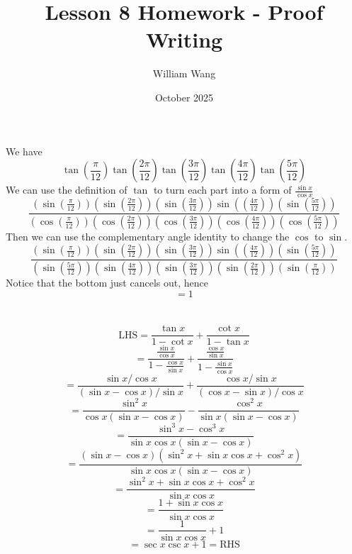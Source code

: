 \documentclass{article}
\title{Lesson 8 Homework - Proof Writing}
\author{William Wang}
\date{October 2025}
\begin{document}
\maketitle

\section{}
We have 
\[\tan(\frac{\pi}{12})\tan(\frac{2\pi}{12})\tan(\frac{3\pi}{12})\tan(\frac{4\pi}{12})\tan(\frac{5\pi}{12})\]
We can use the definition of $\tan$ to turn each part into a form of $\frac{\sin x}{\cos x}$
\[\frac{(\sin(\frac{\pi}{12}))(\sin(\frac{2\pi}{12}))(\sin(\frac{3\pi}{12}))\sin((\frac{4\pi}{12}))(\sin(\frac{5\pi}{12}))}{(\cos(\frac{\pi}{12}))(\cos(\frac{2\pi}{12}))(\cos(\frac{3\pi}{12}))(\cos(\frac{4\pi}{12}))(\cos(\frac{5\pi}{12}))}\]
Then we can use the complementary angle identity to change the $\cos$ to $\sin$. 
\[\frac{(\sin(\frac{\pi}{12}))(\sin(\frac{2\pi}{12}))(\sin(\frac{3\pi}{12}))\sin((\frac{4\pi}{12}))(\sin(\frac{5\pi}{12}))}{(\sin(\frac{5\pi}{12}))(\sin(\frac{4\pi}{12}))(\sin(\frac{3\pi}{12}))(\sin(\frac{2\pi}{12}))(\sin(\frac{\pi}{12}))}\]
Notice that the bottom just cancels out, hence
\[=1\]
\section{}
\[\text{LHS} = \frac{\tan x}{1 - \cot x} + \frac{\cot x}{1 - \tan x}\]
\[= \frac{\frac{\sin x}{\cos x}}{1 - \frac{\cos x}{\sin x}} + \frac{\frac{\cos x}{\sin x}}{1 - \frac{\sin x}{\cos x}} \]
\[= \frac{\sin x / \cos x}{(\sin x - \cos x)/\sin x} + \frac{\cos x / \sin x}{(\cos x - \sin x)/\cos x} \]
\[= \frac{\sin^2 x}{\cos x(\sin x - \cos x)} - \frac{\cos^2 x}{\sin x(\sin x - \cos x)} \]
\[= \frac{\sin^3 x - \cos^3 x}{\sin x \cos x (\sin x - \cos x)} \]
\[= \frac{(\sin x - \cos x)(\sin^2 x + \sin x \cos x + \cos^2 x)}{\sin x \cos x (\sin x - \cos x)} \]
\[= \frac{\sin^2 x + \sin x \cos x + \cos^2 x}{\sin x \cos x} \]
\[= \frac{1 + \sin x \cos x}{\sin x \cos x} \]
\[= \frac{1}{\sin x \cos x} + 1 \]
\[= \sec x \csc x + 1 = \text{RHS}\]
\end{document}
